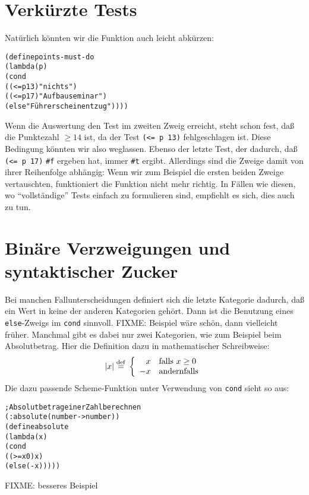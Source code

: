 \section{Verkürzte Tests}

Natürlich könnten wir die Funktion auch leicht abkürzen:
%
\begin{alltt}
(define points-must-do
  (lambda (p)
    (cond
      ((<= p 13) "nichts")
      ((<= p 17) "Aufbauseminar")
      (else "Führerscheinentzug"))))
\end{alltt}
%
Wenn die Auswertung den Test im zweiten Zweig erreicht, steht schon
fest, daß die Punktezahl $\geq 14$ ist, da der Test \verb|(<= p 13)|
fehlgeschlagen ist.  Diese Bedingung könnten wir also weglassen.
Ebenso der letzte Test, der dadurch, daß \verb|(<= p 17)| \verb|#f|
ergeben hat, immer \verb|#t| ergibt.  Allerdings sind die Zweige damit
von ihrer Reihenfolge abhängig: Wenn wir zum Beispiel die ersten
beiden Zweige vertauschten, funktioniert die Funktion nicht mehr
richtig.  In Fällen wie diesen, wo "`vollständige"' Tests einfach zu
formulieren sind, empfiehlt es sich, dies auch zu tun.

\begin{mantra}\label{mantra:comprehensive-tests}
  
\end{mantra}

\section{Binäre Verzweigungen und syntaktischer Zucker}
\label{sec:binaere-verzweigungen}

Bei manchen Fallunterscheidungen definiert sich die letzte Kategorie
dadurch, daß ein Wert in keine der anderen Kategorien gehört.  Dann
ist die Benutzung eines \texttt{else}-Zweigs im \texttt{cond}
sinnvoll.
FIXME: Beispiel wäre schön, dann vielleicht früher.  
Manchmal gibt es dabei nur zwei Kategorien, wie
zum Beispiel beim Absolutbetrag.  Hier die Definition dazu in mathematischer
Schreibweise:
%
\begin{displaymath}
  |x| \stackrel{\rm def}{=}{} \left\{\begin{array}{rl}
      x & \textrm{falls } x \geq 0\\
      -x & \textrm{andernfalls}
    \end{array}
    \right.
\end{displaymath}
%
Die dazu passende Scheme-Funktion unter Verwendung von \texttt{cond}
sieht so aus:
%
\begin{alltt}
; Absolutbetrag einer Zahl berechnen
(: absolute (number -> number))
(define absolute
  (lambda (x)
    (cond
     ((>= x 0) x)
     (else (- x)))))
\end{alltt}
FIXME: besseres Beispiel

